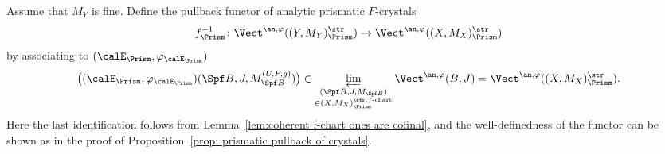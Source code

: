 \begin{defn} \label{defn:pullback-analytic-prismatic-F-crystals}
Assume that $M_Y$ is fine. Define the pullback functor of analytic prismatic $F$-crystals
\[
f_\Prism^{-1}\colon \Vect^{\an,\varphi}((Y,M_Y)_\Prism^{\str})\rightarrow \Vect^{\an,\varphi}((X,M_X)_\Prism^{\str})
\]
by associating to $(\calE_\Prism,\varphi_{\calE_\Prism})$
\[
\bigl((\calE_\Prism,\varphi_{\calE_\Prism})(\Spf B,J,M_{\Spf B}^{(U,P,g)})\bigr)\in \varprojlim_{\substack{(\Spf B,J,M_{\Spf B})\\ \in (X,M_X)_\Prism^{\str, f\text{-}\mathrm{chart}}}}\Vect^{\an,\varphi}(B,J)= \Vect^{\an,\varphi}((X,M_X)_\Prism^{\str}).
\]
Here the last identification follows from Lemma~\ref{lem:coherent f-chart ones are cofinal}, and the well-definedness of the functor can be shown as in the proof of Proposition~\ref{prop: prismatic pullback of crystals}.
\end{defn}




	

